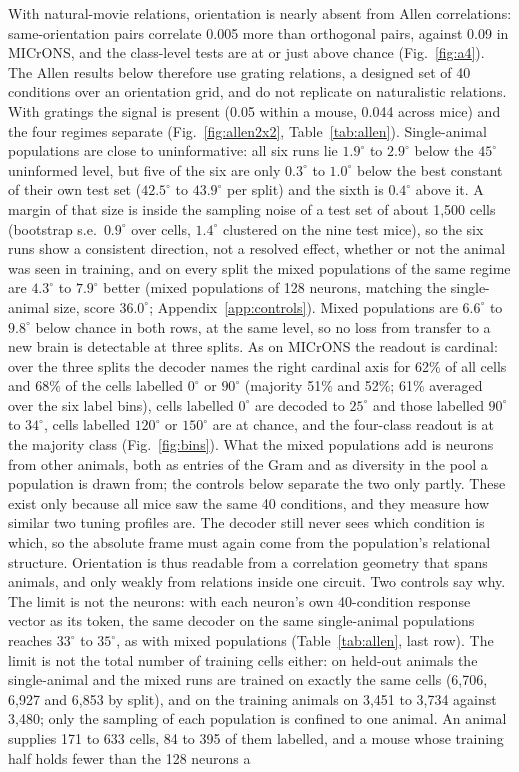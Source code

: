 \documentclass[11pt]{article}
\begin{document}
With natural-movie relations, orientation is nearly absent from Allen correlations: same-orientation pairs correlate 0.005 more than orthogonal pairs, against 0.09 in MICrONS, and the class-level tests are at or just above chance (Fig.~\ref{fig:a4}). The Allen results below therefore use grating relations, a designed set of 40 conditions over an orientation grid, and do not replicate on naturalistic relations. With gratings the signal is present (0.05 within a mouse, 0.044 across mice) and the four regimes separate (Fig.~\ref{fig:allen2x2}, Table~\ref{tab:allen}). Single-animal populations are close to uninformative: all six runs lie $1.9^\circ$ to $2.9^\circ$ below the $45^\circ$ uninformed level, but five of the six are only $0.3^\circ$ to $1.0^\circ$ below the best constant of their own test set ($42.5^\circ$ to $43.9^\circ$ per split) and the sixth is $0.4^\circ$ above it. A margin of that size is inside the sampling noise of a test set of about 1,500 cells (bootstrap s.e.\ $0.9^\circ$ over cells, $1.4^\circ$ clustered on the nine test mice), so the six runs show a consistent direction, not a resolved effect, whether or not the animal was seen in training, and on every split the mixed populations of the same regime are $4.3^\circ$ to $7.9^\circ$ better (mixed populations of 128 neurons, matching the single-animal size, score $36.0^\circ$; Appendix~\ref{app:controls}). Mixed populations are $6.6^\circ$ to $9.8^\circ$ below chance in both rows, at the same level, so no loss from transfer to a new brain is detectable at three splits. As on MICrONS the readout is cardinal: over the three splits the decoder names the right cardinal axis for 62\% of all cells and 68\% of the cells labelled $0^\circ$ or $90^\circ$ (majority 51\% and 52\%; 61\% averaged over the six label bins), cells labelled $0^\circ$ are decoded to $25^\circ$ and those labelled $90^\circ$ to $34^\circ$, cells labelled $120^\circ$ or $150^\circ$ are at chance, and the four-class readout is at the majority class (Fig.~\ref{fig:bins}). What the mixed populations add is neurons from other animals, both as entries of the Gram and as diversity in the pool a population is drawn from; the controls below separate the two only partly. These exist only because all mice saw the same 40 conditions, and they measure how similar two tuning profiles are. The decoder still never sees which condition is which, so the absolute frame must again come from the population's relational structure. Orientation is thus readable from a correlation geometry that spans animals, and only weakly from relations inside one circuit. Two controls say why. The limit is not the neurons: with each neuron's own 40-condition response vector as its token, the same decoder on the same single-animal populations reaches $33^\circ$ to $35^\circ$, as with mixed populations (Table~\ref{tab:allen}, last row). The limit is not the total number of training cells either: on held-out animals the single-animal and the mixed runs are trained on exactly the same cells (6,706, 6,927 and 6,853 by split), and on the training animals on 3,451 to 3,734 against 3,480; only the sampling of each population is confined to one animal. An animal supplies 171 to 633 cells, 84 to 395 of them labelled, and a mouse whose training half holds fewer than the 128 neurons a 
\end{document}
